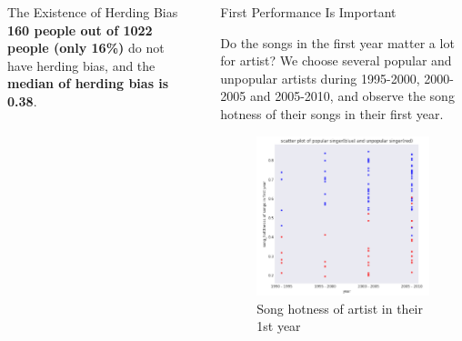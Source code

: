 \documentclass[final]{beamer}
\newlength{\sepwid}
\newlength{\onecolwid}
\newlength{\twocolwid}
\begin{document}
\begin{frame}
\begin{columns}[t]
\begin{column}{\twocolwid}
\begin{columns}[t,totalwidth=\twocolwid]
\begin{column}{\onecolwid}
\begin{exampleblock}{The Existence of Herding Bias}
\vspace{-20mm}
\textbf{160 people out of 1022 people (only 16\%)} do not have herding bias, and the \textbf{median of herding bias is 0.38}.

\end{exampleblock}


\end{column} %
\begin{column}{\sepwid}\end{column} %

\begin{column}{\onecolwid} %


\begin{exampleblock}{First Performance Is Important}

Do the songs in the first year matter a lot for artist? We choose several popular and unpopular artists during 1995-2000, 2000-2005 and 2005-2010, and observe the song hotness of their songs in their first year.

\begin{figure}
\includegraphics[width=1\linewidth]{img/Q2_3.PNG}
\caption{Song hotness of artist in their 1st year}
\end{figure}


\end{exampleblock}
\end{column}
\end{columns}
\end{column}
\end{columns}
\end{frame}
\end{document}
